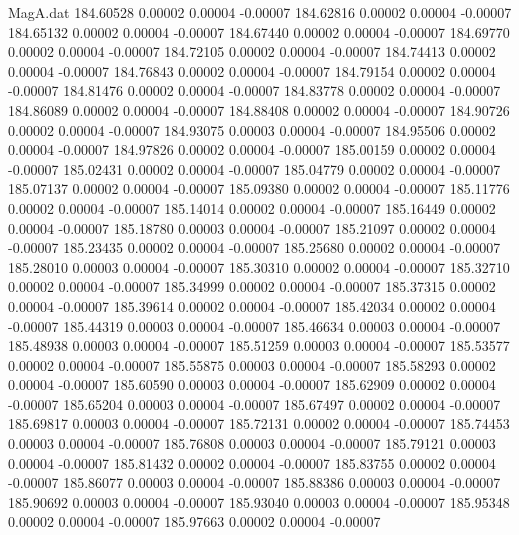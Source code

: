 \begin{filecontents}{MagA.dat}
 184.60528    0.00002    0.00004   -0.00007
 184.62816    0.00002    0.00004   -0.00007
 184.65132    0.00002    0.00004   -0.00007
 184.67440    0.00002    0.00004   -0.00007
 184.69770    0.00002    0.00004   -0.00007
 184.72105    0.00002    0.00004   -0.00007
 184.74413    0.00002    0.00004   -0.00007
 184.76843    0.00002    0.00004   -0.00007
 184.79154    0.00002    0.00004   -0.00007
 184.81476    0.00002    0.00004   -0.00007
 184.83778    0.00002    0.00004   -0.00007
 184.86089    0.00002    0.00004   -0.00007
 184.88408    0.00002    0.00004   -0.00007
 184.90726    0.00002    0.00004   -0.00007
 184.93075    0.00003    0.00004   -0.00007
 184.95506    0.00002    0.00004   -0.00007
 184.97826    0.00002    0.00004   -0.00007
 185.00159    0.00002    0.00004   -0.00007
 185.02431    0.00002    0.00004   -0.00007
 185.04779    0.00002    0.00004   -0.00007
 185.07137    0.00002    0.00004   -0.00007
 185.09380    0.00002    0.00004   -0.00007
 185.11776    0.00002    0.00004   -0.00007
 185.14014    0.00002    0.00004   -0.00007
 185.16449    0.00002    0.00004   -0.00007
 185.18780    0.00003    0.00004   -0.00007
 185.21097    0.00002    0.00004   -0.00007
 185.23435    0.00002    0.00004   -0.00007
 185.25680    0.00002    0.00004   -0.00007
 185.28010    0.00003    0.00004   -0.00007
 185.30310    0.00002    0.00004   -0.00007
 185.32710    0.00002    0.00004   -0.00007
 185.34999    0.00002    0.00004   -0.00007
 185.37315    0.00002    0.00004   -0.00007
 185.39614    0.00002    0.00004   -0.00007
 185.42034    0.00002    0.00004   -0.00007
 185.44319    0.00003    0.00004   -0.00007
 185.46634    0.00003    0.00004   -0.00007
 185.48938    0.00003    0.00004   -0.00007
 185.51259    0.00003    0.00004   -0.00007
 185.53577    0.00002    0.00004   -0.00007
 185.55875    0.00003    0.00004   -0.00007
 185.58293    0.00002    0.00004   -0.00007
 185.60590    0.00003    0.00004   -0.00007
 185.62909    0.00002    0.00004   -0.00007
 185.65204    0.00003    0.00004   -0.00007
 185.67497    0.00002    0.00004   -0.00007
 185.69817    0.00003    0.00004   -0.00007
 185.72131    0.00002    0.00004   -0.00007
 185.74453    0.00003    0.00004   -0.00007
 185.76808    0.00003    0.00004   -0.00007
 185.79121    0.00003    0.00004   -0.00007
 185.81432    0.00002    0.00004   -0.00007
 185.83755    0.00002    0.00004   -0.00007
 185.86077    0.00003    0.00004   -0.00007
 185.88386    0.00003    0.00004   -0.00007
 185.90692    0.00003    0.00004   -0.00007
 185.93040    0.00003    0.00004   -0.00007
 185.95348    0.00002    0.00004   -0.00007
 185.97663    0.00002    0.00004   -0.00007

\end{filecontents}

